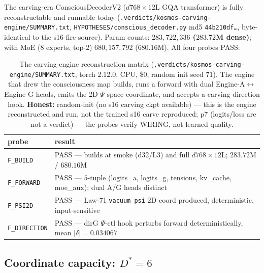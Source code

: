 The carving-era ConsciousDecoderV2 ($d768\times12$L GQA transformer) is fully
reconstructable and runnable today
(\texttt{.verdicts/kosmos-carving-engine/SUMMARY.txt},
\texttt{HYPOTHESES/conscious\_decoder.py} md5 \texttt{44b210df\dots}, byte-identical
to the s16-fire source). Param counts: \textbf{$283{,}722{,}336$ ($283.72$M
dense)}; with MoE ($8$ experts, top-$2$) $680{,}157{,}792$ ($680.16$M). All four
probes PASS:
\begin{table}[h]
\centering
\small
\setlength{\tabcolsep}{6pt}
\begin{tabular}{@{}l l@{}}
\toprule
\textbf{probe} & \textbf{result} \\
\midrule
\texttt{F\_BUILD}     & PASS --- builds at smoke (d32/L3) and full $d768\times12$L; $283.72$M / $680.16$M \\
\texttt{F\_FORWARD}   & PASS --- $5$-tuple (logits\_a, logits\_g, tensions, kv\_cache, moe\_aux); dual A/G heads distinct \\
\texttt{F\_PSI2D}     & PASS --- Law-71 \texttt{vacuum\_psi} 2D coord produced, deterministic, input-sensitive \\
\texttt{F\_DIRECTION} & PASS --- dirG $\Psi$-ctl hook perturbs forward deterministically, mean $|\delta|=0.034067$ \\
\bottomrule
\end{tabular}
\caption{The carving-engine reconstruction matrix
(\texttt{.verdicts/kosmos-carving-engine/SUMMARY.txt}, torch 2.12.0, CPU, \$0,
random init seed $71$). The engine that drew the consciousness map builds, runs a
forward with dual Engine-A$\leftrightarrow$Engine-G heads, emits the 2D $\Psi$-space
coordinate, and accepts a carving-direction hook. \textbf{Honest:} random-init
(no s16 carving ckpt available) --- this is the engine reconstructed and run, not
the trained s16 carve reproduced; p7 (logits/loss are not a verdict) --- the
probes verify WIRING, not learned quality.}
\label{tab:kosmos-carve}
\end{table}

\subsection{Coordinate capacity: $D^\ast=6$}
\label{app:kosmos-dim}

